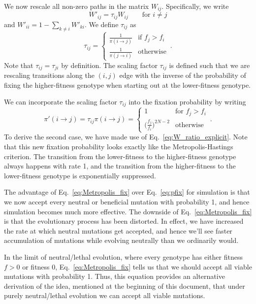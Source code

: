 \documentclass[12pt]{article}
\begin{document}
We now rescale all non-zero paths in the matrix $W_{ij}$. Specifically, we write
\begin{equation}
  W'_{ij} = \tau_{ij} W_{ij} \qquad \text{for $i\neq j$}
\end{equation} 
and $W'_{ii} = 1-\sum_{k\neq i} W'_{ki}$. We define $\tau_{ij}$ as
\begin{equation}
  \tau_{ij} = \begin{cases} \frac{1}{\pi(i\rightarrow j)} & \text{if $f_j>f_i$}\\
     \frac{1}{\pi(j\rightarrow i)} & \text{otherwise}
     \end{cases}\,.
\end{equation}
Note that $\tau_{ij}=\tau_{ji}$ by definition. The scaling factor $\tau_{ij}$ is defined such that we are rescaling transitions along the $(i, j)$ edge with the inverse of the probability of fixing the higher-fitness genotype when starting out at the lower-fitness genotype.

We can incorporate the scaling factor $\tau_{ij}$ into the fixation probability by writing
\begin{equation}\label{eq:Metropolis_fix}
  \pi'(i\rightarrow j) = \tau_{ij} \pi(i\rightarrow j)
      = \begin{cases}
        1 & \text{for $f_j>f_i$} \\
        \Big(\frac{f_j}{f_i}\Big)^{2N-2} & \text{otherwise}
      \end{cases}\,.
\end{equation}
To derive the second case, we have made use of Eq.~\eqref{eq:W_ratio_explicit}. Note that this new fixation probability looks exactly like the Metropolis-Hastings criterion. The transition from the lower-fitness to the higher-fitness genotype always happens with rate 1, and the transition from the higher-fitness to the lower-fitness genotype is exponentially suppressed. 

The advantage of Eq.~\eqref{eq:Metropolis_fix} over Eq.~\eqref{eq:pfix} for simulation is that we now accept every neutral or beneficial mutation with probability 1, and hence simulation becomes much more effective. The downside of Eq.~\eqref{eq:Metropolis_fix} is that the evolutionary process has been distorted. In effect, we have increased the rate at which neutral mutations get accepted, and hence we'll see faster accumulation of mutations while evolving neutrally than we ordinarily would. 

In the limit of neutral/lethal evolution, where every genotype has either fitness $f>0$ or fitness 0, Eq.~\eqref{eq:Metropolis_fix} tells us that we should accept all viable mutations with probability 1. Thus, this equation provides an alternative derivation of the idea, mentioned at the beginning of this document, that under purely neutral/lethal evolution we can accept all viable mutations.
\end{document}
